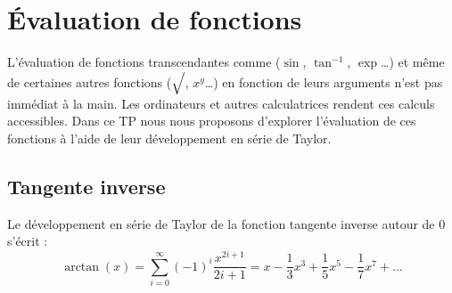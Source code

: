 \section{Évaluation de fonctions}
L'évaluation de fonctions transcendantes
comme ($\sin $, $\tan^{-1}$, $\exp $\ldots) et même de
certaines autres fonctions ($\sqrt{\strut}$, $x^y$\ldots) 
en fonction de leurs arguments n'est
pas immédiat à la main. Les ordinateurs et autres 
calculatrices rendent ces calculs accessibles. Dans ce
TP nous nous proposons d'explorer l'évaluation de ces 
fonctions à l'aide de leur développement en série de Taylor.



\subsection{Tangente inverse}

Le développement en série de Taylor de la fonction tangente inverse autour de 0 
s'écrit : 
\begin{equation}
\arctan(x) = \sum_{i=0}^\infty (-1)^i\frac{x^{2i+1}}{2i+1}
=x -\frac{1}{3}x^3 + \frac{1}{5}x^5-\frac{1}{7}x^7+\ldots
\end{equation}

